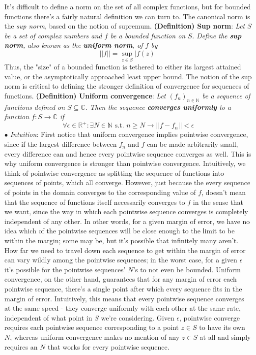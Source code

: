 \documentclass{article}
\newcommand*{\tb}{\textbf}
\newcommand*{\ti}{\textit}
\newcommand*{\nn}{\newline \newline}
\newcommand*{\In}{\indent \ensuremath{\bullet} \textit{Intuition}: }
\newcommand*{\N}{\mathbb{N}}
\newcommand*{\R}{\mathbb{R}}
\newcommand*{\C}{\mathbb{C}}
\newcommand*{\st}{\text{ s.t. }}
\begin{document}
It's difficult to define a norm on the set of all complex functions, but for bounded functions there's a fairly natural definition we can turn to. The canonical norm is the \ti{sup norm}, based on the notion of supremum.
\nn
\tb{(Definition) Sup norm}: \ti{Let $ S $ be a set of complex numbers and $ f $ be a bounded function on $ S $. Define the \tb{sup norm}, also known as the \tb{uniform norm}, of $ f $ by}
    $$ || f || = \sup_{z \in S} | f(z) | $$
Thus, the "size" of a bounded function is tethered to either its largest attained value, or the asymptotically approached least upper bound. The notion of the sup norm is critical to defining the stronger definition of convergence for sequences of functions. 
\nn
\tb{(Definition) Uniform convergence}: \ti{Let $ ( f_n )_{n \in \N} $ be a sequence of functions defined on $ S \subseteq \C $. Then the sequence \tb{converges uniformly} to a function $ f: S \rightarrow \C $ if}
    $$ \forall \epsilon \in \R^+: \exists N \in \N \st n \geq N \rightarrow || f - f_n || < \epsilon $$
\In First notice that uniform convergence implies pointwise convergence, since if the largest difference between $ f_n $ and $ f $ can be made arbitrarily small, every difference can and hence every pointwise sequence converges as well. This is why uniform convergence is stronger than pointwise convergence. Intuitively, we think of pointwise convergence as splitting the sequence of functions into sequences of points, which all converge. However, just because the every sequence of points in the domain converges to the corresponding value of $ f $, doesn't mean that the sequence of functions itself necessarily converges to $ f $ in the sense that we want, since the way in which each pointwise sequence converges is completely independent of any other. In other words, for a given margin of error, we have no idea which of the pointwise sequences will be close enough to the limit to be within the margin; some may be, but it's possible that infinitely many aren't. How far we need to travel down each sequence to get within the margin of error can vary wildly among the pointwise sequences; in the worst case, for a given $ \epsilon $ it's possible for the pointwise sequences' $ N $'s to not even be bounded. Uniform convergence, on the other hand, guarantees that for any margin of error each pointwise sequence, there's a single point after which every sequence fits in the margin of error. Intuitively, this means that every pointwise sequence converges at the same speed - they converge uniformly with each other at the same rate, independent of what point in $ S $ we're considering. Given $ \epsilon $, pointwise converge requires each pointwise sequence corresponding to a point $ z \in S $ to have its own $ N $, whereas uniform convergence makes no mention of any $ z \in S $ at all and simply requires an $ N $ that works for every pointwise sequence.
\end{document}

